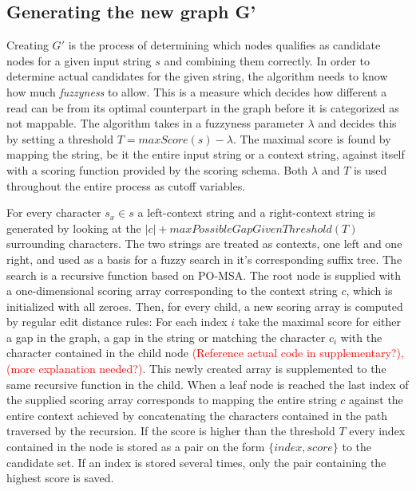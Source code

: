 \documentclass{article}
\begin{document}
\subsection{Generating the new graph G'}
Creating $G'$ is the process of determining which nodes qualifies as candidate nodes for a given input string $s$ and combining them correctly. In order to determine actual candidates for the given string, the algorithm needs to know how much \textit{fuzzyness} to allow. This is a measure which decides how different a read can be from its optimal counterpart in the graph before it is categorized as not mappable. The algorithm takes in a fuzzyness parameter $\lambda$ and decides this by setting a threshold $T=maxScore(s)-\lambda$. The maximal score is found by mapping the string, be it the entire input string or a context string, against itself with a scoring function provided by the scoring schema. Both $\lambda$ and $T$ is used throughout the entire process as cutoff variables.\\
\par\noindent
For every character $s_x \in s$ a left-context string and a right-context string is generated by looking at the $|c| + maxPossibleGapGivenThreshold(T)$ surrounding characters. The two strings are treated as contexts, one left and one right, and used as a basis for a fuzzy search in it's corresponding suffix tree. The search is a recursive function based on PO-MSA. The root node is supplied with a one-dimensional scoring array corresponding to the context string $c$, which is initialized with all zeroes. Then, for every child, a new scoring array is computed by regular edit distance rules: For each index $i$ take the maximal score for either a gap in the graph, a gap in the string or matching the character $c_i$ with the character contained in the child node \textcolor{red}{(Reference actual code in supplementary?), (more explanation needed?)}. This newly created array is supplemented to the same recursive function in the child. When a leaf node is reached the last index of the supplied scoring array corresponds to mapping the entire string $c$ against the entire context achieved by concatenating the characters contained in the path traversed by the recursion. If the score is higher than the threshold $T$ every index contained in the node is stored as a pair on the form $\{index, score\}$ to the candidate set. If an index is stored several times, only the pair containing the highest score is saved.\\
\par\noindent
\end{document}
